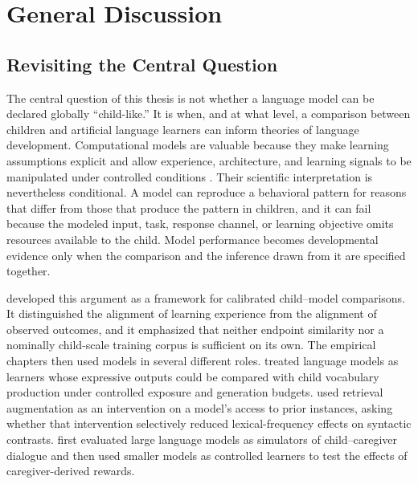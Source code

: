 
\providecommand{\meCDI}{\textsc{corpus-CDI}}

\chapter{General Discussion}
\label{chap:general-discussion}


\section{Revisiting the Central Question}
\label{sec:gd_overview}

The central question of this thesis is not whether a language model can be declared globally ``child-like.'' It is when, and at what level, a comparison between children and artificial language learners can inform theories of language development. Computational models are valuable because they make learning assumptions explicit and allow experience, architecture, and learning signals to be manipulated under controlled conditions \citep{dupoux2018cognitive,warstadt2022what}. Their scientific interpretation is nevertheless conditional. A model can reproduce a behavioral pattern for reasons that differ from those that produce the pattern in children, and it can fail because the modeled input, task, response channel, or learning objective omits resources available to the child. Model performance becomes developmental evidence only when the comparison and the inference drawn from it are specified together.

 developed this argument as a framework for calibrated child--model comparisons. It distinguished the alignment of learning experience from the alignment of observed outcomes, and it emphasized that neither endpoint similarity nor a nominally child-scale training corpus is sufficient on its own. The empirical chapters then used models in several different roles.  treated language models as learners whose expressive outputs could be compared with child vocabulary production under controlled exposure and generation budgets.  used retrieval augmentation as an intervention on a model's access to prior instances, asking whether that intervention selectively reduced lexical-frequency effects on syntactic contrasts.  first evaluated large language models as simulators of child--caregiver dialogue and then used smaller models as controlled learners to test the effects of caregiver-derived rewards.

